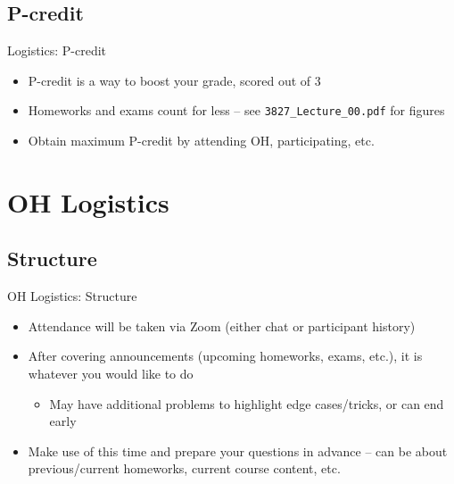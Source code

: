 \documentclass{../slides}
\begin{document}
\subsection{P-credit}
\begin{frame}{Logistics: P-credit}
    \begin{itemize}
        \item P-credit is a way to boost your grade, scored out of $3$
        \item Homeworks and exams count for less -- see \lstinline{3827_Lecture_00.pdf} for figures
        \item Obtain maximum P-credit by attending OH, participating, etc.
    \end{itemize}
\end{frame}

\section{OH Logistics}
\subsection{Structure}
\begin{frame}{OH Logistics: Structure}
    \begin{itemize}
        \item Attendance will be taken via Zoom (either chat or participant history)
        \item After covering announcements (upcoming homeworks, exams, etc.), it is whatever you would like to do
        \begin{itemize}
            \item May have additional problems to highlight edge cases/tricks, or can end early
        \end{itemize}
        \item Make use of this time and prepare your questions in advance -- can be about previous/current homeworks, current course content, etc.
    \end{itemize}
\end{frame}
\end{document}
